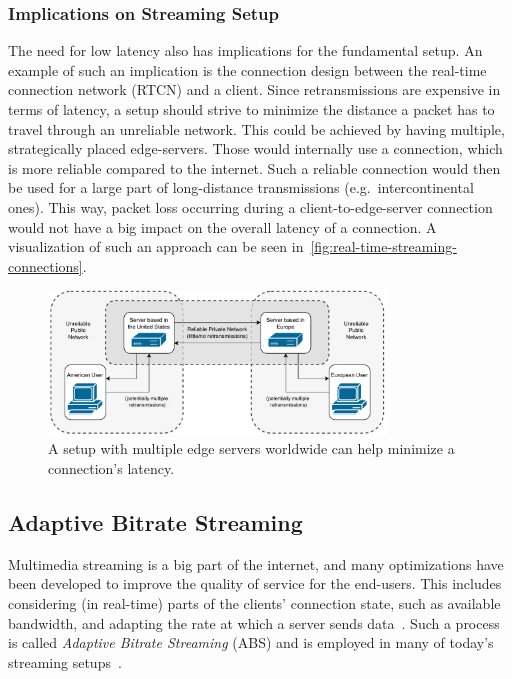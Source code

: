\subsubsection{Implications on Streaming Setup}
The need for low latency also has implications for the fundamental setup.
An example of such an implication is the connection design between the 
real-time connection network (RTCN) and a client.
Since retransmissions are expensive in terms of latency, a setup should strive to minimize 
the distance a packet has to travel through an unreliable network.
This could be achieved by having multiple, strategically placed edge-servers.
Those would internally use a connection, which is more reliable compared to the internet.
Such a reliable connection would then be used for a large part of long-distance transmissions
(e.g.~intercontinental ones).
This way, packet loss occurring during a client-to-edge-server connection would not have a big 
impact on the overall latency of a connection.
A visualization of such an approach can be seen in~\autoref{fig:real-time-streaming-connections}.

\vspace{0.5cm}
\begin{figure}[H]
    \centering
    \includegraphics[width=0.8\textwidth]{figures/02_background/real-time-streaming-connections.drawio.pdf}
    \caption[Real-time streaming connections]{A setup with multiple edge servers worldwide can help minimize a connection's latency.}\label{fig:real-time-streaming-connections}
\end{figure}

\subsection{Adaptive Bitrate Streaming}\label{subsec:adaptive_bitrate_streaming}
Multimedia streaming is a big part of the internet, and many optimizations have
been developed to improve the quality of service for the end-users.
This includes considering (in real-time) parts of the clients' connection state, 
such as available bandwidth, and adapting the rate at which a server sends 
data~\parencite{cloudflare-what-is-adaptive-bitrate-streaming,imagekit-adaptive-bitrate-streaming}.
Such a process is called \textit{Adaptive Bitrate Streaming} (ABS) and is employed in many 
of today's streaming setups~\parencite{netflix-optimizing-stream-experience}.

